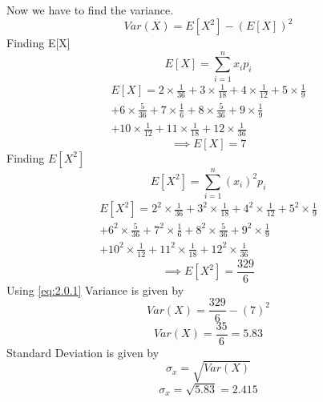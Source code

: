 \documentclass[journal,12pt,twocolumn]{IEEEtran}
\begin{document}
Now we have to find the variance.
\begin{equation}\label{eq:2.0.1}
     Var(X) = E[X^2] - (E[X])^2
\end{equation}
Finding E[X]
\begin{equation}\label{eq:2.0.2}
    E[X] = \sum_{i=1}^{n} x_i p_i
\end{equation}
\begin{equation*}
\begin{split}
    E[X] = 2\times \frac{1}{36} + 3 \times \frac{1}{18} + 4\times \frac{1}{12} + 5 \times \frac{1}{9}\\ + 6 \times \frac{5}{36} + 7 \times \frac{1}{6} + 8 \times \frac{5}{36} + 9 \times \frac{1}{9} \\+ 10 \times \frac{1}{12} + 11 \times \frac{1}{18} + 12 \times \frac{1}{36}
\end{split}
\end{equation*}
\begin{equation*}
  \implies  E[X] = 7
\end{equation*}
\newpage
Finding $E[X^2]$
\begin{equation}\label{eq:2.0.3}
    E[X^2] = \sum_{i=1}^{n} (x_i)^2 p_i
\end{equation}
\begin{equation*}
\begin{split}
    E[X^2] = 2^2\times \frac{1}{36} + 3^2 \times \frac{1}{18} + 4^2\times \frac{1}{12} + 5^2 \times \frac{1}{9}\\ + 6^2 \times \frac{5}{36} + 7^2 \times \frac{1}{6} + 8^2 \times \frac{5}{36} + 9^2 \times \frac{1}{9} \\+ 10^2 \times \frac{1}{12} + 11^2 \times \frac{1}{18} + 12^2 \times \frac{1}{36}
\end{split}
\end{equation*}
\begin{equation*}
  \implies  E[X^2] = \frac{329}{6}
\end{equation*}
Using \eqref{eq:2.0.1} Variance is given by \\
\begin{equation*}
    Var(X) = \frac{329}{6} - (7)^2
\end{equation*}
\begin{equation*}
    Var(X) = \frac{35}{6} = 5.83
\end{equation*}
Standard Deviation is given by
\begin{equation}\label{eq:2.0.4}
    \sigma_x = \sqrt{Var(X)} 
\end{equation}
\begin{equation*}
    \sigma_x  = \sqrt{5.83} = 2.415
\end{equation*}
\end{document}
